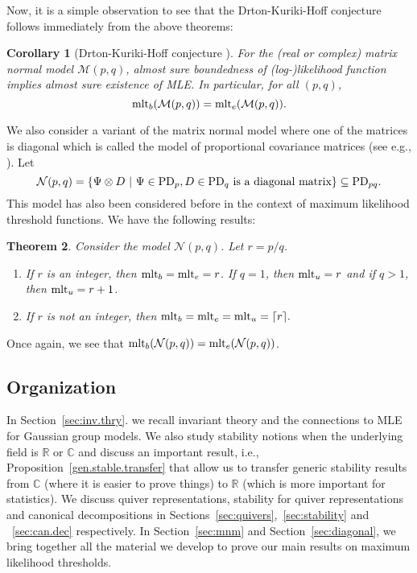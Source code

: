 \documentclass[11pt]{amsart}
\newtheorem{theorem}{Theorem}[section]
\newtheorem{corollary}[theorem]{Corollary}
\theoremstyle{definition}
\newcommand{\R}{{\mathbb R}}
\newcommand{\PD} {{\rm PD}}
\newcommand{\mlt}{{\rm mlt}}
\newcommand{\C}{{\mathbb C}}
\begin{document}
Now, it is a simple observation to see that the Drton-Kuriki-Hoff conjecture \cite{Drton-etal} follows immediately from the above theorems:

\begin{corollary} [Drton-Kuriki-Hoff conjecture \cite{Drton-etal}] \label{Conj-DKH}
For the (real or complex) matrix normal model $\mathcal{M}(p,q)$, almost sure boundedness of (log-)likelihood function implies almost sure existence of MLE. In particular, for all $(p,q)$,  
$$\mlt_b(\mathcal{M}(p,q)) = \mlt_e(\mathcal{M}(p,q)).$$
\end{corollary}










We also consider a variant of the matrix normal model where one of the matrices is diagonal which is called the model of proportional covariance matrices (see e.g., \cite{Eriksen}). Let 
$$
\mathcal{N}(p,q) = \{\Psi \otimes D\ |\ \Psi \in \PD_p, D \in \PD_q \text{ is a diagonal matrix}\} \subseteq \PD_{pq}.
$$
This model has also been considered before \cite{Ros} in the context of maximum likelihood threshold functions. We have the following results:

\begin{theorem} \label{theo:diag.model}
Consider the model $\mathcal{N}(p,q)$. Let $r = p/q$.
\begin{enumerate}
\item If $r$ is an integer, then $\mlt_b = \mlt_e = r$. If $q = 1$, then $\mlt_u = r$ and if $q >1$, then $\mlt_u = r  + 1$.
\item If $r$ is not an integer, then $\mlt_b = \mlt_e = \mlt_u = \lceil r \rceil.$
\end{enumerate}
\end{theorem}

Once again, we see that $\mlt_b(\mathcal{N}(p,q)) = \mlt_e(\mathcal{N}(p,q))$. 


\subsection{Organization}
In Section~\ref{sec:inv.thry}. we recall invariant theory and the connections to MLE for Gaussian group models. We also study stability notions when the underlying field is $\R$ or $\C$ and discuss an important result, i.e., Proposition~\ref{gen.stable.transfer} that allow us to transfer generic stability results from $\C$ (where it is easier to prove things) to $\R$ (which is more important for statistics). We discuss quiver representations, stability for quiver representations and canonical decompositions in Sections~\ref{sec:quivers},~\ref{sec:stability} and ~\ref{sec:can.dec} respectively. In Section~\ref{sec:mnm} and Section~\ref{sec:diagonal}, we bring together all the material we develop to prove our main results on maximum likelihood thresholds.
\end{document}
